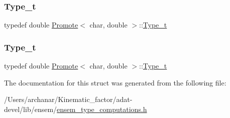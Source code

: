 \subsubsection{\texorpdfstring{Type\_t}{Type\_t}\hspace{0.1cm}{\footnotesize\ttfamily [2/3]}}
{\footnotesize\ttfamily typedef double \mbox{\hyperlink{structPromote}{Promote}}$<$ char, double $>$\+::\mbox{\hyperlink{structPromote_3_01char_00_01double_01_4_ac5f86ae4e12f2be8737cfb818bd7d82d}{Type\+\_\+t}}}

\mbox{\label{structPromote_3_01char_00_01double_01_4_ac5f86ae4e12f2be8737cfb818bd7d82d}} 
\subsubsection{\texorpdfstring{Type\_t}{Type\_t}\hspace{0.1cm}{\footnotesize\ttfamily [3/3]}}
{\footnotesize\ttfamily typedef double \mbox{\hyperlink{structPromote}{Promote}}$<$ char, double $>$\+::\mbox{\hyperlink{structPromote_3_01char_00_01double_01_4_ac5f86ae4e12f2be8737cfb818bd7d82d}{Type\+\_\+t}}}



The documentation for this struct was generated from the following file\+:\begin{DoxyCompactItemize}
\item 
/\+Users/archanar/\+Kinematic\+\_\+factor/adat-\/devel/lib/ensem/\mbox{\hyperlink{adat-devel_2lib_2ensem_2ensem__type__computations_8h}{ensem\+\_\+type\+\_\+computations.\+h}}\end{DoxyCompactItemize}
